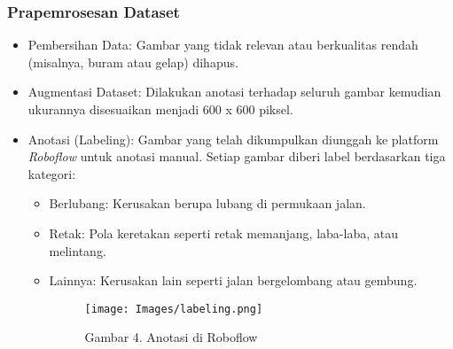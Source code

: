 \documentclass[12pt,a4paper]{article}
\begin{document}
\subsubsection{Prapemrosesan Dataset}
\begin{itemize}
    \item Pembersihan Data: Gambar yang tidak relevan atau berkualitas rendah (misalnya, buram atau gelap) dihapus.
    \item Augmentasi Dataset: Dilakukan anotasi terhadap seluruh gambar kemudian ukurannya disesuaikan menjadi 600 x 600 piksel.
    \item Anotasi (Labeling): Gambar yang telah dikumpulkan diunggah ke platform \textit{Roboflow} untuk anotasi manual. Setiap gambar diberi label berdasarkan tiga kategori: 
    \begin{itemize}
        \item Berlubang: Kerusakan berupa lubang di permukaan jalan.
        \item Retak: Pola keretakan seperti retak memanjang, laba-laba, atau melintang.
        \item Lainnya: Kerusakan lain seperti jalan bergelombang atau gembung.
        \begin{figure}[h]
            \centering
            \texttt{[image: Images/labeling.png]}
            \caption*{Gambar 4. Anotasi di Roboflow}
            \label{fig:enter-label}
        \end{figure}
    \end{itemize}
\end{itemize}
\end{document}
